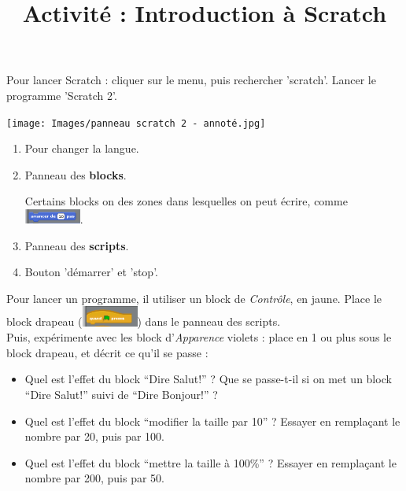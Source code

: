 \documentclass[a4paper,11pt]{article}
\title{Activité : Introduction à Scratch}
\author{}
\date{}
\begin{document}
\maketitle

\begin{greybox}[frametitle={Pour commencer}]
	Pour lancer Scratch : cliquer sur le menu, puis rechercher 'scratch'. Lancer le programme 'Scratch 2'.

	\texttt{[image: Images/panneau scratch 2 - annoté.jpg]}

	\begin{enumerate}
		\item Pour changer la langue.
		\item Panneau des \textbf{blocks}.

		      Certains blocks on des zones dans lesquelles on peut écrire, comme \includegraphics[width=5em]{Images/Block avancer de 10 pas.png}.
		\item Panneau des \textbf{scripts}.
		\item Bouton 'démarrer' et 'stop'.
	\end{enumerate}
\end{greybox}

\begin{exercice}
	Pour lancer un programme, il  utiliser un block de \textit{Contrôle}, en jaune. Place le block drapeau (\includegraphics[width=5em]{Images/Block drapeau.png}) dans le panneau des scripts. \\

	Puis, expérimente avec les block d'\textit{Apparence} violets : place en 1 ou plus sous le block drapeau, et décrit ce qu'il se passe :
	\begin{itemize}
		\setlength\itemsep{3em}
		\item Quel est l'effet du block “Dire Salut!” ? Que se passe-t-il si on met un block “Dire Salut!” suivi de “Dire Bonjour!” ?
		\item Quel est l'effet du block “modifier la taille par 10” ? Essayer en remplaçant le nombre par 20, puis par 100.
		\item Quel est l'effet du block “mettre la taille à 100\%” ? Essayer en remplaçant le nombre par 200, puis par 50.
	\end{itemize}
\end{exercice}
\end{document}
